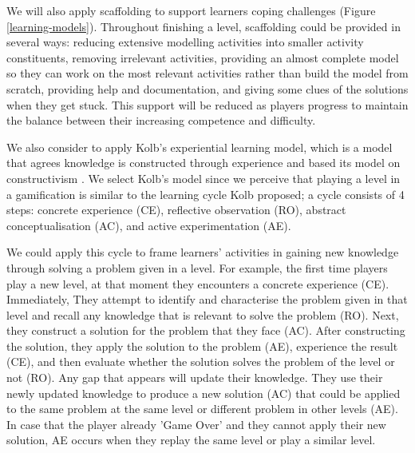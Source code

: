\documentclass[12pt, a4paper]{report}
\begin{document}
{We will also apply scaffolding \cite{vygotsky1978mind, wood1976role} to support learners coping challenges (Figure \ref{learning-models}). Throughout finishing a level, scaffolding could be provided in several ways: reducing extensive modelling activities into smaller activity constituents, removing irrelevant activities, providing an almost complete model so they can work on the most relevant activities rather than build the model from scratch, providing help and documentation, and giving some clues of the solutions when they get stuck. This support will be reduced as players progress to maintain the balance between their increasing competence and difficulty.

We also consider to apply Kolb's experiential learning model, which is a model that agrees knowledge is constructed through experience and based its model on constructivism \cite{kolb2014experiential}. We select Kolb's model since we perceive that playing a level in a gamification is similar to the learning cycle Kolb proposed; a cycle consists of 4 steps: concrete experience (CE), reflective observation (RO), abstract conceptualisation (AC), and active experimentation (AE). 

We could apply this cycle to frame learners' activities in gaining new knowledge through solving a problem given in a level. For example, the first time players play a new level, at that moment they encounters a concrete experience (CE). Immediately, They attempt to identify and characterise the problem given in that level and recall any knowledge that is relevant to solve the problem (RO). Next, they construct a solution for the problem that they face (AC). After constructing the solution, they apply the solution to the problem (AE), experience the result (CE), and then evaluate whether the solution solves the problem of the level or not (RO). Any gap that appears will update their knowledge. They use their newly updated knowledge to produce a new solution (AC) that could be applied to the same problem at the same level or different problem in other levels (AE). In case that the player already 'Game Over' and they cannot apply their new solution, AE occurs when they replay the same level or play a similar level.

}
\end{document}
